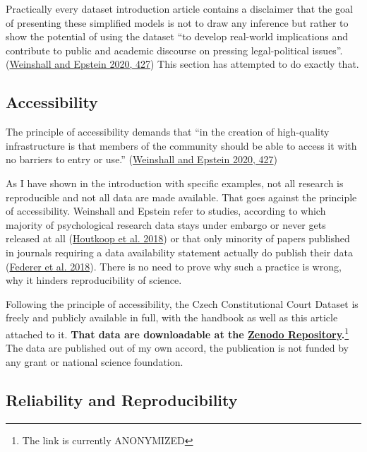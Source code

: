 \documentclass[
  11pt,
]{article}
\begin{document}
Practically every dataset introduction article contains a disclaimer
that the goal of presenting these simplified models is not to draw any
inference but rather to show the potential of using the dataset ``to
develop real-world implications and contribute to public and academic
discourse on pressing legal-political issues''.
(\protect\hyperlink{ref-weinshallDevelopingHighQualityData2020}{Weinshall
and Epstein 2020, 427}) This section has attempted to do exactly that.

\hypertarget{accessibility}{%
\subsection{Accessibility}\label{accessibility}}

The principle of accessibility demands that ``in the creation of
high-quality infrastructure is that members of the community should be
able to access it with no barriers to entry or use.''
(\protect\hyperlink{ref-weinshallDevelopingHighQualityData2020}{Weinshall
and Epstein 2020, 427})

As I have shown in the introduction with specific examples, not all
research is reproducible and not all data are made available. That goes
against the principle of accessibility. Weinshall and Epstein refer to
studies, according to which majority of psychological research data
stays under embargo or never gets released at all
(\protect\hyperlink{ref-houtkoopDataSharingPsychology2018}{Houtkoop et
al. 2018}) or that only minority of papers published in journals
requiring a data availability statement actually do publish their data
(\protect\hyperlink{ref-federerDataSharingPLOS2018}{Federer et al.
2018}). There is no need to prove why such a practice is wrong, why it
hinders reproducibility of science.

Following the principle of accessibility, the Czech Constitutional Court
Dataset is freely and publicly available in full, with the handbook as
well as this article attached to it. \textbf{That data are downloadable
at the \href{LINK\%20ANONYMIZED}{Zenodo Repository}.}\footnote{The link
  is currently ANONYMIZED} The data are published out of my own accord,
the publication is not funded by any grant or national science
foundation.

\hypertarget{reliability-and-reproducibility}{%
\subsection{Reliability and
Reproducibility}\label{reliability-and-reproducibility}}
\end{document}
